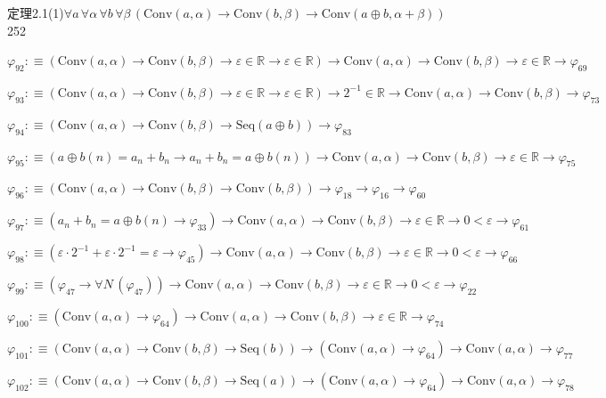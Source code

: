 \begin{fullproof}{定理2.1(1)}{$\forall a\,\forall \alpha\,\forall b\,\forall \beta\,(\mathrm{Conv}(a,\alpha) \to \mathrm{Conv}(b,\beta) \to \mathrm{Conv}(a \oplus b,\alpha + \beta))$}{252}
\begin{abbrevlist}
\item $\varphi_{92} :\equiv (\mathrm{Conv}(a,\alpha) \to \mathrm{Conv}(b,\beta) \to \varepsilon \in \mathbb{R} \to \varepsilon \in \mathbb{R}) \to \mathrm{Conv}(a,\alpha) \to \mathrm{Conv}(b,\beta) \to \varepsilon \in \mathbb{R} \to \varphi_{69}$
\item $\varphi_{93} :\equiv (\mathrm{Conv}(a,\alpha) \to \mathrm{Conv}(b,\beta) \to \varepsilon \in \mathbb{R} \to \varepsilon \in \mathbb{R}) \to 2^{-1} \in \mathbb{R} \to \mathrm{Conv}(a,\alpha) \to \mathrm{Conv}(b,\beta) \to \varphi_{73}$
\item $\varphi_{94} :\equiv (\mathrm{Conv}(a,\alpha) \to \mathrm{Conv}(b,\beta) \to \mathrm{Seq}(a \oplus b)) \to \varphi_{83}$
\item $\varphi_{95} :\equiv (a \oplus b(n) = a_{n} + b_{n} \to a_{n} + b_{n} = a \oplus b(n)) \to \mathrm{Conv}(a,\alpha) \to \mathrm{Conv}(b,\beta) \to \varepsilon \in \mathbb{R} \to \varphi_{75}$
\item $\varphi_{96} :\equiv (\mathrm{Conv}(a,\alpha) \to \mathrm{Conv}(b,\beta) \to \mathrm{Conv}(b,\beta)) \to \varphi_{18} \to \varphi_{16} \to \varphi_{60}$
\item $\varphi_{97} :\equiv (a_{n} + b_{n} = a \oplus b(n) \to \varphi_{33}) \to \mathrm{Conv}(a,\alpha) \to \mathrm{Conv}(b,\beta) \to \varepsilon \in \mathbb{R} \to 0 < \varepsilon \to \varphi_{61}$
\item $\varphi_{98} :\equiv (\varepsilon \cdot 2^{-1} + \varepsilon \cdot 2^{-1} = \varepsilon \to \varphi_{45}) \to \mathrm{Conv}(a,\alpha) \to \mathrm{Conv}(b,\beta) \to \varepsilon \in \mathbb{R} \to 0 < \varepsilon \to \varphi_{66}$
\item $\varphi_{99} :\equiv (\varphi_{47} \to \forall N\,(\varphi_{47})) \to \mathrm{Conv}(a,\alpha) \to \mathrm{Conv}(b,\beta) \to \varepsilon \in \mathbb{R} \to 0 < \varepsilon \to \varphi_{22}$
\item $\varphi_{100} :\equiv (\mathrm{Conv}(a,\alpha) \to \varphi_{64}) \to \mathrm{Conv}(a,\alpha) \to \mathrm{Conv}(b,\beta) \to \varepsilon \in \mathbb{R} \to \varphi_{74}$
\item $\varphi_{101} :\equiv (\mathrm{Conv}(a,\alpha) \to \mathrm{Conv}(b,\beta) \to \mathrm{Seq}(b)) \to (\mathrm{Conv}(a,\alpha) \to \varphi_{64}) \to \mathrm{Conv}(a,\alpha) \to \varphi_{77}$
\item $\varphi_{102} :\equiv (\mathrm{Conv}(a,\alpha) \to \mathrm{Conv}(b,\beta) \to \mathrm{Seq}(a)) \to (\mathrm{Conv}(a,\alpha) \to \varphi_{64}) \to \mathrm{Conv}(a,\alpha) \to \varphi_{78}$

\end{abbrevlist}
\end{fullproof}
